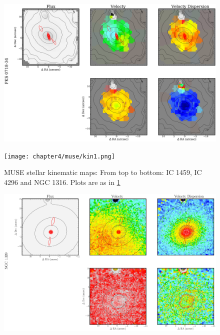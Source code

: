 		\begin{figure}
			\centering
			\includegraphics[height=0.31\textheight]{chapter4/vimos/kin4.png}
		\end{figure}


		\begin{figure}
			\centering
			\texttt{[image: chapter4/muse/kin1.png]}
			\caption[MUSE stellar kinematic maps]{MUSE stellar kinematic maps: From top to bottom: IC 1459, IC 4296 and NGC 1316. Plots are as in \ref{fig:MUSE_stellar}}
			\label{fig:MUSE_stellar}
		\end{figure}
		\begin{figure}
			\centering
			\includegraphics[height=0.31\textheight]{chapter4/muse/kin2.png}
		\end{figure}

